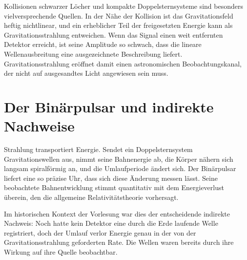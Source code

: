 Kollisionen schwarzer Löcher und kompakte Doppelsternsysteme sind besonders vielversprechende Quellen. In der Nähe der Kollision ist das Gravitationsfeld heftig nichtlinear, und ein erheblicher Teil der freigesetzten Energie kann als Gravitationsstrahlung entweichen. Wenn das Signal einen weit entfernten Detektor erreicht, ist seine Amplitude so schwach, dass die lineare Wellenausbreitung eine ausgezeichnete Beschreibung liefert. Gravitationsstrahlung eröffnet damit einen astronomischen Beobachtungskanal, der nicht auf ausgesandtes Licht angewiesen sein muss.

\section{Der Binärpulsar und indirekte Nachweise}

Strahlung transportiert Energie. Sendet ein Doppelsternsystem Gravitationswellen aus, nimmt seine Bahnenergie ab, die Körper nähern sich langsam spiralförmig an, und die Umlaufperiode ändert sich. Der Binärpulsar liefert eine so präzise Uhr, dass sich diese Änderung messen lässt. Seine beobachtete Bahnentwicklung stimmt quantitativ mit dem Energieverlust überein, den die allgemeine Relativitätstheorie vorhersagt.

Im historischen Kontext der Vorlesung war dies der entscheidende indirekte Nachweis: Noch hatte kein Detektor eine durch die Erde laufende Welle registriert, doch der Umlauf verlor Energie genau in der von der Gravitationsstrahlung geforderten Rate. Die Wellen waren bereits durch ihre Wirkung auf ihre Quelle beobachtbar.

\begin{classroomqa}
\end{classroomqa}

\begin{classroomqa}
\end{classroomqa}

